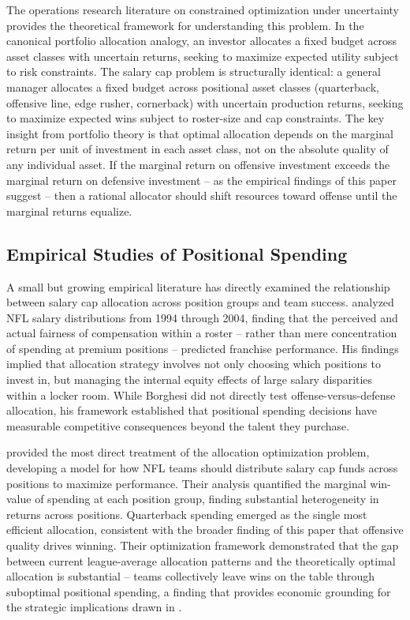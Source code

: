 The operations research literature on constrained optimization under uncertainty provides the theoretical framework for understanding this problem. In the canonical portfolio allocation analogy, an investor allocates a fixed budget across asset classes with uncertain returns, seeking to maximize expected utility subject to risk constraints. The salary cap problem is structurally identical: a general manager allocates a fixed budget across positional asset classes (quarterback, offensive line, edge rusher, cornerback) with uncertain production returns, seeking to maximize expected wins subject to roster-size and cap constraints. The key insight from portfolio theory is that optimal allocation depends on the marginal return per unit of investment in each asset class, not on the absolute quality of any individual asset. If the marginal return on offensive investment exceeds the marginal return on defensive investment  -- as the empirical findings of this paper suggest  -- then a rational allocator should shift resources toward offense until the marginal returns equalize.

\subsection{Empirical Studies of Positional Spending}
\label{sec:positional-spending}

A small but growing empirical literature has directly examined the relationship between salary cap allocation across position groups and team success. \textcite{borghesi2008allocation} analyzed NFL salary distributions from 1994 through 2004, finding that the perceived and actual fairness of compensation within a roster  -- rather than mere concentration of spending at premium positions  -- predicted franchise performance. His findings implied that allocation strategy involves not only choosing which positions to invest in, but managing the internal equity effects of large salary disparities within a locker room. While Borghesi did not directly test offense-versus-defense allocation, his framework established that positional spending decisions have measurable competitive consequences beyond the talent they purchase.

\textcite{mulholland2019optimizing} provided the most direct treatment of the allocation optimization problem, developing a model for how NFL teams should distribute salary cap funds across positions to maximize performance. Their analysis quantified the marginal win-value of spending at each position group, finding substantial heterogeneity in returns across positions. Quarterback spending emerged as the single most efficient allocation, consistent with the broader finding of this paper that offensive quality drives winning. Their optimization framework demonstrated that the gap between current league-average allocation patterns and the theoretically optimal allocation is substantial  -- teams collectively leave wins on the table through suboptimal positional spending, a finding that provides economic grounding for the strategic implications drawn in .

